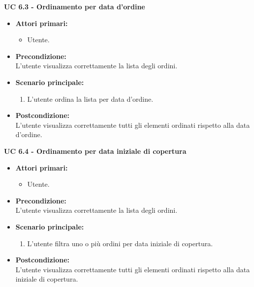 \vspace{0.4cm}

\noindent \textbf{\large UC 6.3 - Ordinamento per data d'ordine }
\label{uc:ordinamento-data-ordine}
\begin{itemize}

	\item \textbf{Attori primari: }
		\begin{itemize}
			\item Utente.
		\end{itemize}

	\item \textbf{Precondizione: }\\[0.3cm]
		L'utente visualizza correttamente la lista degli ordini.

	\item \textbf{Scenario principale: }
		\begin{enumerate}
			\item L'utente ordina la lista per data d'ordine.
		\end{enumerate}
		

	\item \textbf{Postcondizione: }\\[0.3cm]
		L'utente visualizza correttamente tutti gli elementi ordinati rispetto alla data d'ordine.

\end{itemize}

\vspace{0.4cm}

\noindent \textbf{\large UC 6.4 - Ordinamento per data iniziale di copertura }
\label{uc:ordinamento-data-iniziale-copertura}
\begin{itemize}

	\item \textbf{Attori primari: }
		\begin{itemize}
			\item Utente.
		\end{itemize}

	\item \textbf{Precondizione: }\\[0.3cm]
		L'utente visualizza correttamente la lista degli ordini.

	\item \textbf{Scenario principale: }
		\begin{enumerate}
			\item L'utente filtra uno o più ordini per data iniziale di copertura.
		\end{enumerate}
		

	\item \textbf{Postcondizione: }\\[0.3cm]
		L'utente visualizza correttamente tutti gli elementi ordinati rispetto alla data iniziale di copertura.

\end{itemize}

